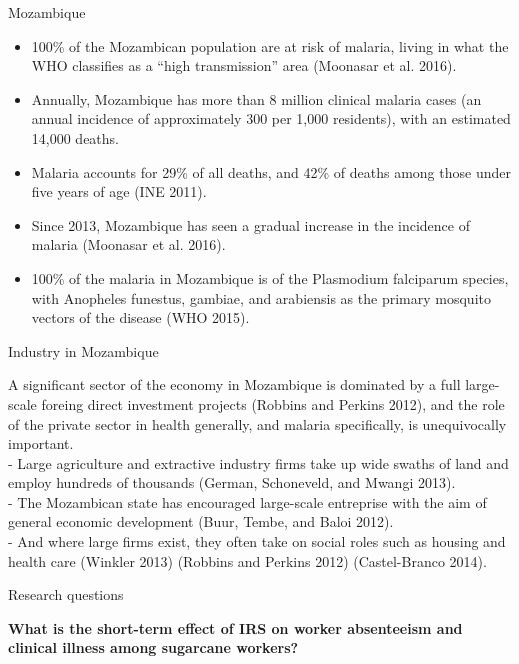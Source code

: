 \documentclass[ignorenonframetext,]{beamer}
\providecommand{\tightlist}{%
  \setlength{\itemsep}{0pt}\setlength{\parskip}{0pt}}
\begin{document}
\begin{frame}{Mozambique}

\begin{itemize}
\tightlist
\item
  100\% of the Mozambican population are at risk of malaria, living in
  what the WHO classifies as a ``high transmission'' area (Moonasar et
  al. 2016).\\
\item
  Annually, Mozambique has more than 8 million clinical malaria cases
  (an annual incidence of approximately 300 per 1,000 residents), with
  an estimated 14,000 deaths.\\
\item
  Malaria accounts for 29\% of all deaths, and 42\% of deaths among
  those under five years of age (INE 2011).\\
\item
  Since 2013, Mozambique has seen a gradual increase in the incidence of
  malaria (Moonasar et al. 2016).\\
\item
  100\% of the malaria in Mozambique is of the Plasmodium falciparum
  species, with Anopheles funestus, gambiae, and arabiensis as the
  primary mosquito vectors of the disease (WHO 2015).
\end{itemize}

\end{frame}

\begin{frame}{Industry in Mozambique}

A significant sector of the economy in Mozambique is dominated by a full
large-scale foreing direct investment projects (Robbins and Perkins
2012), and the role of the private sector in health generally, and
malaria specifically, is unequivocally important.\\
- Large agriculture and extractive industry firms take up wide swaths of
land and employ hundreds of thousands (German, Schoneveld, and Mwangi
2013).\\
- The Mozambican state has encouraged large-scale entreprise with the
aim of general economic development (Buur, Tembe, and Baloi 2012).\\
- And where large firms exist, they often take on social roles such as
housing and health care (Winkler 2013) (Robbins and Perkins 2012)
(Castel-Branco 2014).

\end{frame}

\begin{frame}{Research questions}

\textbf{What is the short-term effect of IRS on worker absenteeism and
clinical illness among sugarcane workers?}

\end{frame}
\end{document}
